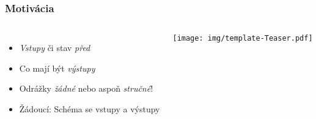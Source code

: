 




\begin{frame}
  \frametitle{Motivácia}
  \begin{columns}
    \begin{itemize}
        \item \emph{Vstupy} či stav \emph{před}
        \item Co mají být \emph{výstupy}
        \item Odrážky \emph{žádné} nebo aspoň \emph{stručné}!
        \item Žádoucí: Schéma se vstupy a výstupy
    \end{itemize}
     
    \texttt{[image: img/template-Teaser.pdf]}
  \end{columns}
\end{frame}




